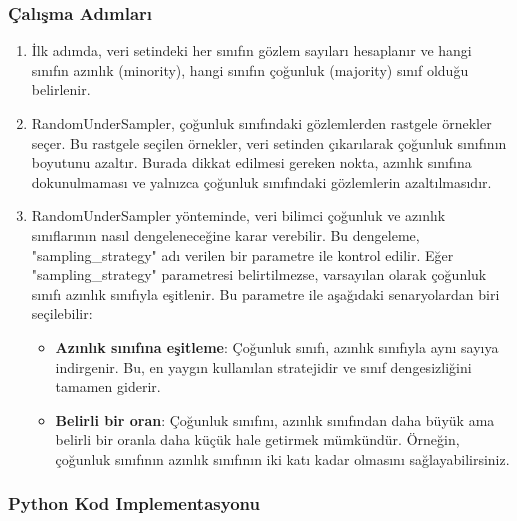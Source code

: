 \subsubsection{Çalışma Adımları}

\begin{enumerate}
    \item İlk adımda, veri setindeki her sınıfın gözlem sayıları hesaplanır ve hangi sınıfın azınlık (minority), hangi sınıfın çoğunluk (majority) sınıf olduğu belirlenir.
    \item RandomUnderSampler, çoğunluk sınıfındaki gözlemlerden rastgele örnekler seçer. Bu rastgele seçilen örnekler, veri setinden çıkarılarak çoğunluk sınıfının boyutunu azaltır. Burada dikkat edilmesi gereken nokta, azınlık sınıfına dokunulmaması ve yalnızca çoğunluk sınıfındaki gözlemlerin azaltılmasıdır.
    \item RandomUnderSampler yönteminde, veri bilimci çoğunluk ve azınlık sınıflarının nasıl dengeleneceğine karar verebilir. Bu dengeleme, "sampling\_strategy" adı verilen bir parametre ile kontrol edilir. Eğer "sampling\_strategy" parametresi belirtilmezse, varsayılan olarak çoğunluk sınıfı azınlık sınıfıyla eşitlenir. Bu parametre ile aşağıdaki senaryolardan biri seçilebilir:
    \begin{itemize}
        \item \textbf{Azınlık sınıfına eşitleme}: Çoğunluk sınıfı, azınlık sınıfıyla aynı sayıya indirgenir. Bu, en yaygın kullanılan stratejidir ve sınıf dengesizliğini tamamen giderir.
        \item \textbf{Belirli bir oran}: Çoğunluk sınıfını, azınlık sınıfından daha büyük ama belirli bir oranla daha küçük hale getirmek mümkündür. Örneğin, çoğunluk sınıfının azınlık sınıfının iki katı kadar olmasını sağlayabilirsiniz.
    \end{itemize}
\end{enumerate}

\subsubsection{Python Kod Implementasyonu}

